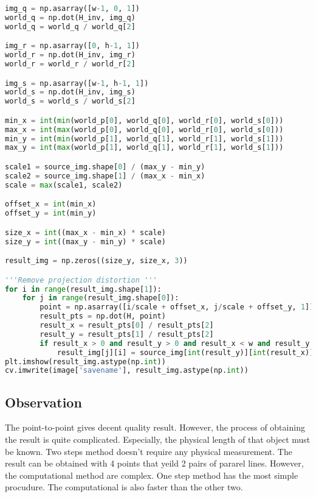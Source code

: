 \documentclass[11pt]{article}
\begin{document}
\begin{lstlisting}[language=Python, showstringspaces=false]
img_q = np.asarray([w-1, 0, 1])
world_q = np.dot(H_inv, img_q)
world_q = world_q / world_q[2]

img_r = np.asarray([0, h-1, 1])
world_r = np.dot(H_inv, img_r)
world_r = world_r / world_r[2]

img_s = np.asarray([w-1, h-1, 1])
world_s = np.dot(H_inv, img_s)
world_s = world_s / world_s[2]

min_x = int(min(world_p[0], world_q[0], world_r[0], world_s[0]))
max_x = int(max(world_p[0], world_q[0], world_r[0], world_s[0]))
min_y = int(min(world_p[1], world_q[1], world_r[1], world_s[1]))
max_y = int(max(world_p[1], world_q[1], world_r[1], world_s[1]))

scale1 = source_img.shape[0] / (max_y - min_y)
scale2 = source_img.shape[1] / (max_x - min_x)
scale = max(scale1, scale2)

offset_x = int(min_x) 
offset_y = int(min_y) 

size_x = int((max_x - min_x) * scale)
size_y = int((max_y - min_y) * scale)

result_img = np.zeros((size_y, size_x, 3))

'''Remove projection distortion '''
for i in range(result_img.shape[1]):
    for j in range(result_img.shape[0]):
        point = np.asarray([i/scale + offset_x, j/scale + offset_y, 1])
        result_pts = np.dot(H, point)
        result_x = result_pts[0] / result_pts[2]
        result_y = result_pts[1] / result_pts[2]
        if result_x > 0 and result_y > 0 and result_x < w and result_y < h:
            result_img[j][i] = source_img[int(result_y)][int(result_x)]
plt.imshow(result_img.astype(np.int))
cv.imwrite(image['savename'], result_img.astype(np.int))

\end{lstlisting}


\subsection*{Observation}

The point-to-point gives decent quality result. However, the process of obtaining the result is quite complicated. Especially, the physical length of that object must be known. Two steps method doesn't require any physical measurement. The result can be obtained with 4 points that yeild 2 pairs of pararel lines. However, the computational method are complex. One step method has the most simple procudure. The computational is also faster than the other two. 
\end{document}
